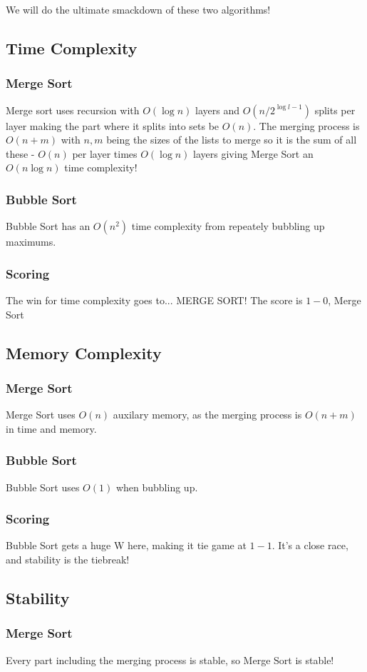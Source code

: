 \documentclass{article}
\begin{document}
We will do the ultimate smackdown of these two algorithms!
\subsection{Time Complexity}
\subsubsection{Merge Sort}
Merge sort uses recursion with $O( \log n)$ layers and 
$O(n/2^{\log l - 1})$ splits per layer making the part 
where it splits into sets be $O(n)$. The merging process 
is $O(n + m)$ with $n, m$ being the sizes of the lists to 
merge so it is the sum of all these - $O(n)$ per layer 
times $O(\log n)$ layers giving Merge Sort 
an $O(n \log n)$ time complexity!
\subsubsection{Bubble Sort}
Bubble Sort has an $O(n^2)$ time complexity from repeately bubbling up 
maximums.
\subsubsection{Scoring}
The win for time complexity goes to... MERGE SORT! \newline
The score is $1 - 0$, Merge Sort
\subsection{Memory Complexity}
\subsubsection{Merge Sort}
Merge Sort uses $O(n)$ auxilary memory, as the merging process is $O(n + m)$ in time and memory.
\subsubsection{Bubble Sort}
Bubble Sort uses $O(1)$ when bubbling up.
\subsubsection{Scoring}
Bubble Sort gets a huge W here, making it tie game at $1 - 1$. It's a close race, and stability is the tiebreak!
\subsection{Stability}
\subsubsection{Merge Sort}
Every part including the merging process is stable, so Merge Sort is stable!
\end{document}
